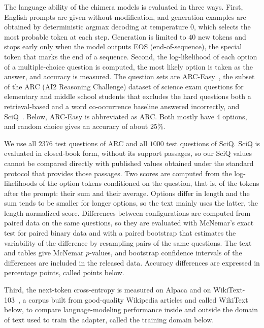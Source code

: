 \documentclass[conference]{IEEEtran}
\begin{document}
The language ability of the chimera models is evaluated in three ways. First, English prompts are given without modification, and
generation examples are obtained by deterministic argmax decoding at temperature $0$, which selects the most probable token at each
step. Generation is limited to $40$ new tokens and stops early only when the model outputs EOS (end-of-sequence), the special token
that marks the end of a sequence. Second, the log-likelihood of each option of a multiple-choice question is computed, the most likely
option is taken as the answer, and accuracy is measured. The question sets are ARC-Easy~\cite{clark2018thinksolvedquestionanswering},
the subset of the ARC (AI2 Reasoning Challenge) dataset of science exam questions for elementary and middle school students that
excludes the hard questions both a retrieval-based and a word co-occurrence baseline answered incorrectly, and
SciQ~\cite{welbl-etal-2017-crowdsourcing}. Below, ARC-Easy is abbreviated as ARC. Both mostly
have 4 options, and random choice gives an accuracy of about $25\%$.

We use all $2376$ test questions of ARC and all $1000$ test questions of SciQ.
SciQ is evaluated in closed-book form, without its support passages, so our SciQ values cannot be compared directly with published
values obtained under the standard protocol that provides those passages.
Two scores are computed from the log-likelihoods of the option tokens conditioned on the question, that is, of the tokens after the
prompt: their sum and their average.
Options differ in length and the sum tends to be smaller for longer options, so the text mainly uses the latter, the length-normalized
score. Differences between configurations are computed from paired data on the same questions, so they are evaluated with McNemar's exact test
for paired binary data and with a paired bootstrap that estimates the variability of the difference by resampling pairs of the same
questions. The text and tables give McNemar $p$-values, and bootstrap confidence intervals of the differences are included in the
released data. Accuracy differences are expressed in percentage points, called points below.

Third, the next-token cross-entropy is measured on Alpaca and on WikiText-103~\cite{merity2017pointer}, a
corpus built from good-quality Wikipedia articles and called WikiText below, to compare language-modeling performance inside and outside the domain of text used to train the
adapter, called the training domain below.
\end{document}
